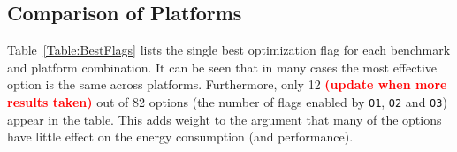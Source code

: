 \documentclass[twocolumn]{article}
\newcommand{\todo}[1]{\textbf{\textcolor{red}{#1}}}
\begin{document}

\subsection{Comparison of Platforms}

Table~\ref{Table:BestFlags} lists the single best optimization flag for each benchmark and platform combination. It can be seen that in many cases the most effective option is the same across platforms. Furthermore, only 12 \todo{(update when more results taken)} out of 82 options (the number of flags enabled by \texttt{O1}, \texttt{O2} and \texttt{O3}) appear in the table. This adds weight to the argument that many of the options have little effect on the energy consumption (and performance).
\end{document}
